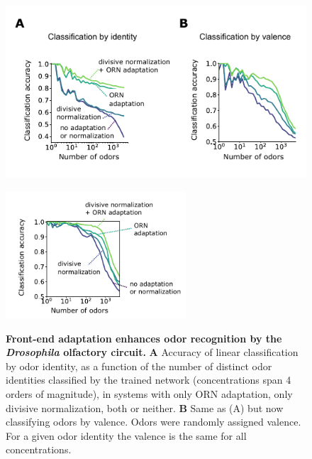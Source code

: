 \documentclass[9pt,lineno]{elife}
\begin{document}
\begin{figure}
	\includegraphics[width=0.8\linewidth]{figure5}
	\caption{\footnotesize{\textbf{Front-end adaptation enhances odor recognition by the \textit{Drosophila} olfactory circuit.} 
			\textbf{A} Accuracy of linear classification by odor identity, as a function of the number of distinct odor identities classified by the trained network (concentrations span 4 orders of magnitude), in systems with only ORN adaptation, only divisive normalization, both or neither. \textbf{B} Same as (A) but now classifying odors by valence. Odors were randomly assigned valence. For a given odor identity the valence is the same for all concentrations.
	}}
	\label{fig:downstream}
	{\includegraphics[width=0.6\textwidth]{figure5_supp1}}
	\label{figsupp:SI_downstream}
\end{figure}
\end{document}
